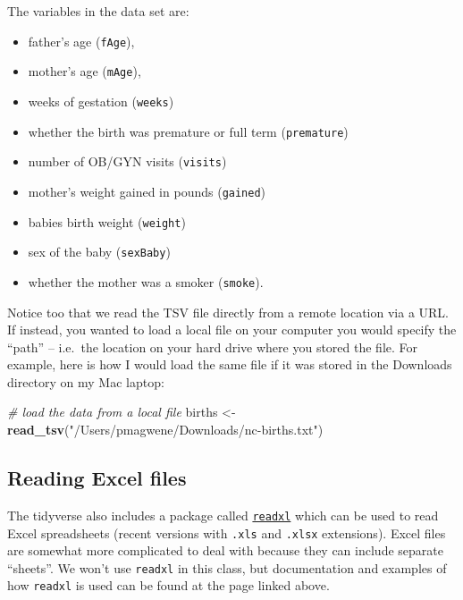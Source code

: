 \documentclass[]{book}
\newenvironment{Shaded}{\begin{snugshade}}{\end{snugshade}}
\newcommand{\CommentTok}[1]{\textcolor[rgb]{0.56,0.35,0.01}{\textit{#1}}}
\newcommand{\KeywordTok}[1]{\textcolor[rgb]{0.13,0.29,0.53}{\textbf{#1}}}
\newcommand{\NormalTok}[1]{#1}
\newcommand{\StringTok}[1]{\textcolor[rgb]{0.31,0.60,0.02}{#1}}
\providecommand{\tightlist}{%
  \setlength{\itemsep}{0pt}\setlength{\parskip}{0pt}}
\theoremstyle{definition}
\theoremstyle{definition}
\theoremstyle{definition}
\theoremstyle{remark}
\begin{document}
The variables in the data set are:

\begin{itemize}
\tightlist
\item
  father's age (\texttt{fAge}),
\item
  mother's age (\texttt{mAge}),\\
\item
  weeks of gestation (\texttt{weeks})
\item
  whether the birth was premature or full term (\texttt{premature})
\item
  number of OB/GYN visits (\texttt{visits})
\item
  mother's weight gained in pounds (\texttt{gained})
\item
  babies birth weight (\texttt{weight})
\item
  sex of the baby (\texttt{sexBaby})
\item
  whether the mother was a smoker (\texttt{smoke}).
\end{itemize}

Notice too that we read the TSV file directly from a remote location via
a URL. If instead, you wanted to load a local file on your computer you
would specify the ``path'' -- i.e.~the location on your hard drive where
you stored the file. For example, here is how I would load the same file
if it was stored in the Downloads directory on my Mac laptop:

\begin{Shaded}
\begin{Highlighting}[]
\CommentTok{# load the data from a local file}
\NormalTok{births <-}\StringTok{ }\KeywordTok{read_tsv}\NormalTok{(}\StringTok{"/Users/pmagwene/Downloads/nc-births.txt"}\NormalTok{)}
\end{Highlighting}
\end{Shaded}

\hypertarget{reading-excel-files}{%
\subsection{Reading Excel files}\label{reading-excel-files}}

The tidyverse also includes a package called
\href{http://readxl.tidyverse.org}{\texttt{readxl}} which can be used to
read Excel spreadsheets (recent versions with \texttt{.xls} and
\texttt{.xlsx} extensions). Excel files are somewhat more complicated to
deal with because they can include separate ``sheets''. We won't use
\texttt{readxl} in this class, but documentation and examples of how
\texttt{readxl} is used can be found at the page linked above.
\end{document}
